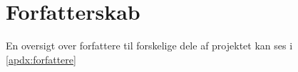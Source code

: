 \section{Forfatterskab}
En oversigt over forfattere til forskelige dele af projektet kan ses i \cref{apdx:forfattere}